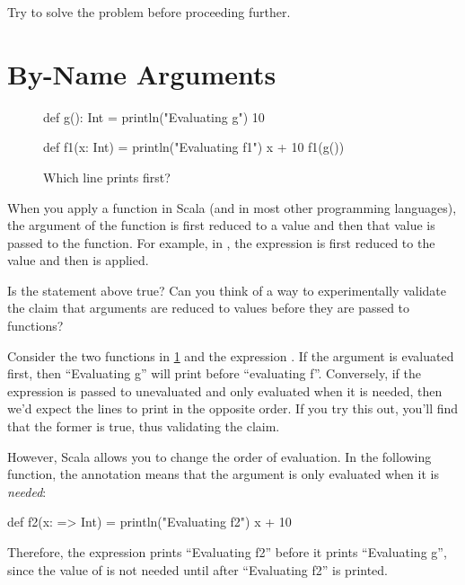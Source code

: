 \begin{think}
  Try to solve the problem before proceeding further.
\end{think}

\section{By-Name Arguments}

\begin{figure}
\begin{scalacode}
def g(): Int = {
  println("Evaluating g")
  10
}

def f1(x: Int) = {
  println("Evaluating f1")
  x + 10
}
f1(g())
\end{scalacode}
\caption{Which line prints first?}
\label{evalorder1}
\end{figure}

When you apply a function in Scala (and in most other programming languages), the argument
of the function is first reduced to a value and then that value is passed to the function.
For example, in , the expression  is first reduced
to the value  and then  is applied.

\begin{think}
  Is the statement above true? Can you think of a way to experimentally validate the
  claim that arguments are reduced to values before they are passed to functions?
 \end{think}

Consider the two functions in \cref{evalorder1} and the expression
.  If the argument is evaluated first, then
``Evaluating g'' will print before ``evaluating f''. Conversely, if
the expression  is passed to  unevaluated
and only evaluated when it is needed, then we'd expect the lines to print in the opposite
order. If you try this out, you'll find that the former is true, thus validating the
claim.

However, Scala allows you to change the order of evaluation.
In the following function, the \scalainline{=>} annotation means that the argument
is only evaluated when it is \emph{needed}:
\begin{scalacode}
def f2(x: => Int) = {
  println("Evaluating f2")
  x + 10
}
\end{scalacode}
Therefore, the expression  prints ``Evaluating f2'' before it prints
``Evaluating g'', since the value of  is not needed until after
``Evaluating f2'' is printed.

